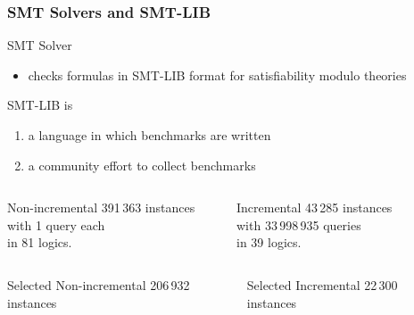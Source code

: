 \documentclass[table]{beamer}
\def\emph#1{\textcolor{MYblue}{#1}}
\begin{document}
\begin{frame}
  \frametitle{SMT Solvers and SMT-LIB}
  SMT Solver
  \begin{itemize}
  \item checks formulas
    in \emph{SMT-LIB} format
    for \emph{satisfiability modulo theories}
  \end{itemize}
  \bigskip

  SMT-LIB is
  \begin{enumerate}
  \item a \emph{language} in which benchmarks are written
  \item a community effort to \emph{collect benchmarks}
  \end{enumerate}
  \medskip

  \begin{columns}
    \begin{column}{0.4\textwidth}
      \begin{block}{Non-incremental}
        391\,363 instances\\
        with 1 query each \\
        in 81 logics.
      \end{block}
    \end{column}
    \begin{column}{0.4\textwidth}
      \begin{block}{Incremental}
        43\,285 instances\\
        with 33\,998\,935 queries \\
        in 39 logics.
      \end{block}
    \end{column}
    \begin{column}{0.08\textwidth}
    \end{column}
  \end{columns}
  \pause
    \begin{columns}
    \begin{column}{0.4\textwidth}
      \begin{block}{Selected Non-incremental}
        206\,932 instances
      \end{block}
    \end{column}
    \begin{column}{0.4\textwidth}
      \begin{block}{Selected Incremental}
        22\,300 instances
      \end{block}
    \end{column}
    \begin{column}{0.08\textwidth}
    \end{column}
  \end{columns}

\end{frame}
\end{document}
